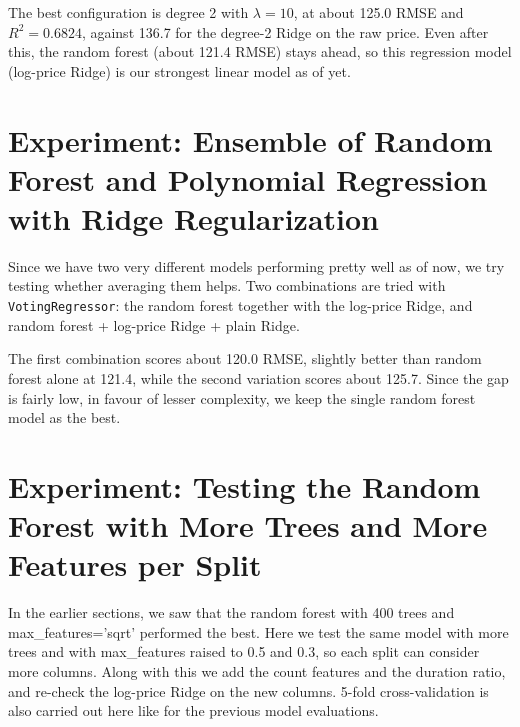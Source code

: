 \documentclass[11pt]{article}
\begin{document}
The best configuration is degree 2 with $\lambda=10$, at about 125.0 RMSE and $R^2 = 0.6824$, against 136.7 for the degree-2 Ridge on the raw price. Even after this, the random forest (about 121.4 RMSE) stays ahead, so this regression model (log-price Ridge) is our strongest linear model as of yet.

\section{Experiment: Ensemble of Random Forest and Polynomial Regression with Ridge Regularization}

Since we have two very different models performing pretty well as of now, we try testing whether averaging them helps. Two combinations are tried with \texttt{VotingRegressor}: the random forest together with the log-price Ridge, and random forest + log-price Ridge + plain Ridge.

The first combination scores about 120.0 RMSE, slightly better than random forest alone at 121.4, while the second variation scores about 125.7. Since the gap is fairly low, in favour of lesser complexity, we keep the single random forest model as the best.

\section{Experiment: Testing the Random Forest with More Trees and More Features per Split}

In the earlier sections, we saw that the random forest with 400 trees and max\_features='sqrt' performed the best. Here we test the same model with more trees and with max\_features raised to 0.5 and 0.3, so each split can consider more columns. Along with this we add the count features and the duration ratio, and re-check the log-price Ridge on the new columns. 5-fold cross-validation is also carried out here like for the previous model evaluations.
\end{document}
